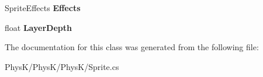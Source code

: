 \begin{DoxyCompactItemize}
\item 
Sprite\+Effects {\bfseries Effects}\hypertarget{class_phys_k_1_1_sprite_a72469c980c72cffb92585489d2fb9be7}{}\label{class_phys_k_1_1_sprite_a72469c980c72cffb92585489d2fb9be7}

\item 
float {\bfseries Layer\+Depth}\hypertarget{class_phys_k_1_1_sprite_a76feb08a54791bcfa90b0a472a15e892}{}\label{class_phys_k_1_1_sprite_a76feb08a54791bcfa90b0a472a15e892}

\end{DoxyCompactItemize}


The documentation for this class was generated from the following file\+:\begin{DoxyCompactItemize}
\item 
Phys\+K/\+Phys\+K/\+Phys\+K/Sprite.\+cs\end{DoxyCompactItemize}
